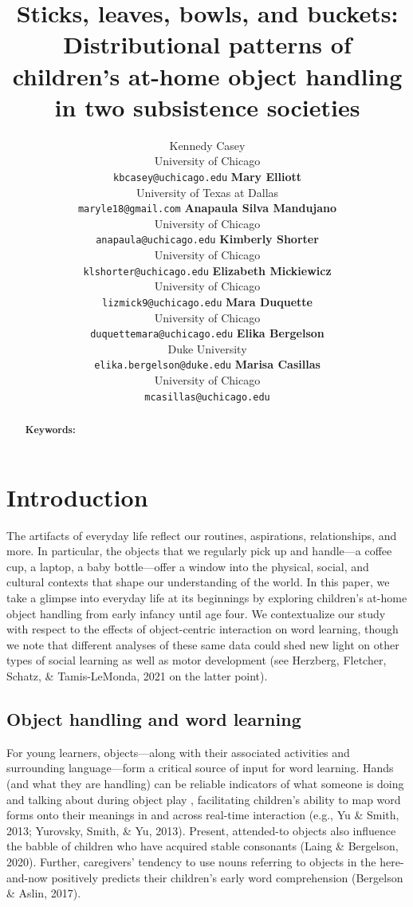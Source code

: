 \documentclass[10pt, letterpaper]{article}
\title{Sticks, leaves, bowls, and buckets: Distributional patterns of
children's at-home object handling in two subsistence societies}
\author{Kennedy Casey \\
        University of Chicago \\
        \texttt{\small{kbcasey@uchicago.edu}}
\And \textbf{Mary Elliott} \\
             University of Texas at Dallas \\
             \texttt{\small{maryle18@gmail.com}}
\And \textbf{Anapaula Silva Mandujano} \\
             University of Chicago \\
             \texttt{\small{anapaula@uchicago.edu}}   
\And \textbf{Kimberly Shorter} \\
             University of Chicago \\
             \texttt{\small{klshorter@uchicago.edu}}
\AND \textbf{Elizabeth Mickiewicz} \\
             University of Chicago \\
             \texttt{\small{lizmick9@uchicago.edu}}         
\And \textbf{Mara Duquette} \\
             University of Chicago \\
             \texttt{\small{duquettemara@uchicago.edu}}
\And \textbf{Elika Bergelson} \\
             Duke University \\
             \texttt{\small{elika.bergelson@duke.edu}}
\And \textbf{Marisa Casillas} \\
             University of Chicago \\
             \texttt{\small{mcasillas@uchicago.edu}}}
\begin{document}
\maketitle

\begin{abstract}


\textbf{Keywords:}

\end{abstract}

\hypertarget{introduction}{%
\section{Introduction}\label{introduction}}

The artifacts of everyday life reflect our routines, aspirations,
relationships, and more. In particular, the objects that we regularly
pick up and handle---a coffee cup, a laptop, a baby bottle---offer a
window into the physical, social, and cultural contexts that shape our
understanding of the world. In this paper, we take a glimpse into
everyday life at its beginnings by exploring children's at-home object
handling from early infancy until age four. We contextualize our study
with respect to the effects of object-centric interaction on word
learning, though we note that different analyses of these same data
could shed new light on other types of social learning as well as motor
development (see Herzberg, Fletcher, Schatz, \& Tamis-LeMonda, 2021 on
the latter point).

\hypertarget{object-handling-and-word-learning}{%
\subsection{Object handling and word
learning}\label{object-handling-and-word-learning}}

For young learners, objects---along with their associated activities and
surrounding language---form a critical source of input for word
learning. Hands (and what they are handling) can be reliable indicators
of what someone is doing and talking about during object play ,
facilitating children's ability to map word forms onto their meanings in
and across real-time interaction (e.g., Yu \& Smith, 2013; Yurovsky,
Smith, \& Yu, 2013). Present, attended-to objects also influence the
babble of children who have acquired stable consonants (Laing \&
Bergelson, 2020). Further, caregivers' tendency to use nouns referring
to objects in the here-and-now positively predicts their children's
early word comprehension (Bergelson \& Aslin, 2017).
\end{document}
